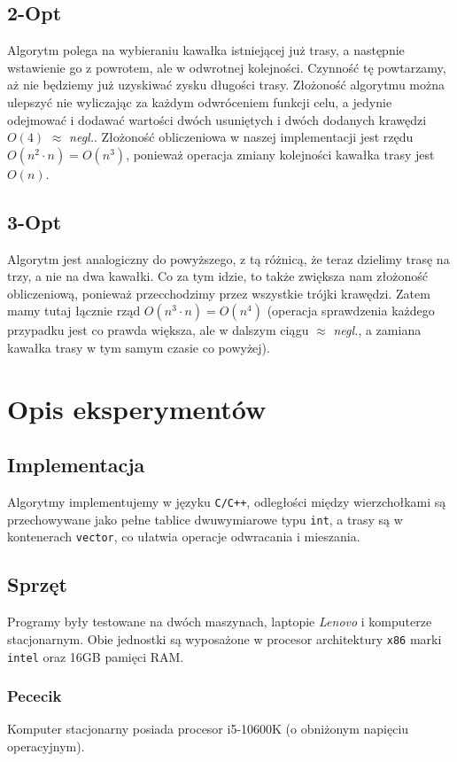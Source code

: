 \documentclass{article}
\begin{document}
\subsection{2-Opt}
Algorytm polega na wybieraniu kawałka istniejącej już trasy, a następnie wstawienie go z powrotem, ale w odwrotnej kolejności. Czynność tę powtarzamy, aż nie będziemy już uzyskiwać zysku długości trasy. Złożoność algorytmu można ulepszyć nie wyliczając za każdym odwróceniem funkcji celu, a jedynie odejmować i dodawać wartości dwóch usuniętych i dwóch dodanych krawędzi $O(4)$ $\approx$ \textit{negl.}. Złożoność obliczeniowa w naszej implementacji jest rzędu $O(n^2\cdot n) = O(n^3)$, ponieważ operacja zmiany kolejności kawałka trasy jest $O(n)$.

\subsection{3-Opt}
Algorytm jest analogiczny do powyższego, z tą różnicą, że teraz dzielimy trasę na trzy, a nie na dwa kawałki. Co za tym idzie, to także zwiększa nam złożoność obliczeniową, ponieważ przecchodzimy przez wszystkie trójki krawędzi. Zatem mamy tutaj łącznie rząd $O(n^3\cdot n) = O(n^4)$ (operacja sprawdzenia każdego przypadku jest co prawda większa, ale w dalszym ciągu $\approx$ \textit{negl.}, a zamiana kawałka trasy w tym samym czasie co powyżej).

\section{Opis eksperymentów}
\subsection{Implementacja}
Algorytmy implementujemy w języku \texttt{C/C++}, odległości między wierzchołkami są przechowywane jako pełne tablice dwuwymiarowe typu \texttt{int}, a trasy są w kontenerach \texttt{vector}, co ułatwia operacje odwracania i mieszania.

\subsection{Sprzęt}
Programy były testowane na dwóch maszynach, laptopie \textit{Lenovo} i komputerze stacjonarnym. Obie jednostki są wyposażone w procesor architektury \texttt{x86} marki \texttt{intel} oraz 16GB pamięci RAM.

\subsubsection{Pececik}
Komputer stacjonarny posiada procesor i5-10600K (o obniżonym napięciu operacyjnym).
\end{document}
